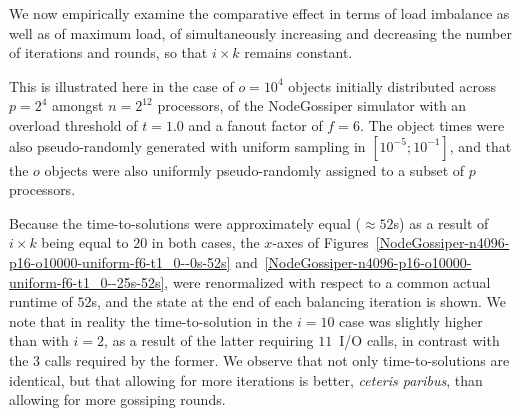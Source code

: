 We now empirically examine the comparative effect in terms of load
imbalance as well as of maximum load, of simultaneously increasing and
decreasing the number of iterations and rounds, so that $i\times{k}$
remains constant.

This is illustrated here in the case of $o=10^4$ objects initially
distributed across $p=2^4$ amongst $n=2^{12}$ processors, of the
\textsf{NodeGossiper} simulator with an overload threshold of $t=1.0$
and a fanout factor of $f=6$.
The object times were also pseudo-randomly generated with uniform
sampling in $[10^{-5};10^{-1}]$, and that the $o$ objects were also
uniformly pseudo-randomly assigned to a subset of $p$ processors.

Because the time-to-solutions were approximately equal ($\approx52$s)
as a result of $i\times{k}$ being equal to $20$ in both cases, 
the $x$-axes of
Figures~\ref{NodeGossiper-n4096-p16-o10000-uniform-f6-t1_0--0s-52s}
and~\ref{NodeGossiper-n4096-p16-o10000-uniform-f6-t1_0--25s-52s},
were renormalized with respect to a common actual runtime of $52$s,
and the state at the end of each balancing iteration is shown. We note
that in reality the time-to-solution in the $i=10$ case was slightly
higher than with $i=2$, as a result of the latter requiring $11$~I/O
calls, in contrast with the $3$ calls required by the former.
We observe that not only time-to-solutions are identical, but that
allowing for more iterations is better, \emph{ceteris paribus}, than
allowing for more gossiping rounds.